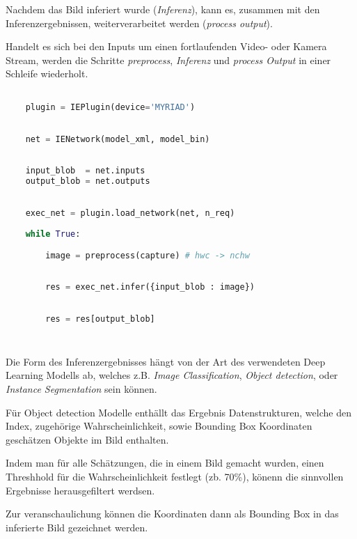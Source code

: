 Nachdem das Bild inferiert wurde (\textit{Inferenz}),
kann es, zusammen mit den Inferenzergebnissen, 
weiterverarbeitet werden (\textit{process
output}).

Handelt es sich bei den Inputs 
um einen fortlaufenden Video- oder 
Kamera Stream, werden die Schritte 
\textit{preprocess}, \textit{Inferenz} und 
\textit{process Output} in einer Schleife wiederholt.


\vspace{1cm}
\begin{minipage}{0.30\textwidth}
    \centering
    
    \label{fig:inger_engine_workflow}
\end{minipage}
\begin{minipage}{0.70\textwidth}

\begin{lstlisting}[language=Python]

    plugin = IEPlugin(device='MYRIAD')

        
    net = IENetwork(model_xml, model_bin)
        
    
    input_blob  = net.inputs
    output_blob = net.outputs
        

    exec_net = plugin.load_network(net, n_req)
        
    while True:

        image = preprocess(capture) # hwc -> nchw
        
        
        res = exec_net.infer({input_blob : image})
        

        res = res[output_blob]
        
        
\end{lstlisting}
\vspace{1.5cm}
\end{minipage}
\vspace{1cm}


Die Form des Inferenzergebnisses hängt von der 
Art des verwendeten Deep Learning Modells ab, welches 
z.B. \textit{Image Classification}, \textit{Object detection},
oder \textit{Instance
Segmentation} sein können.

Für Object detection Modelle enthällt das Ergebnis
 Datenstrukturen, welche den Index, 
 zugehörige Wahrscheinlichkeit, sowie Bounding 
 Box Koordinaten geschätzen Objekte im Bild enthalten.

Indem man für alle Schätzungen, die in einem Bild gemacht wurden, 
einen Threshhold für die Wahrscheinlichkeit festlegt (zb. 70\%),
könenn die sinnvollen Ergebnisse herausgefiltert werdsen.

Zur veranschaulichung können die Koordinaten dann 
als Bounding Box in das inferierte Bild gezeichnet werden.


